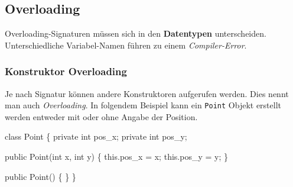 \documentclass[
  9pt,
  a4paperpaper,
  DIV=11]{scrartcl}
\newenvironment{Shaded}{}{}
\newcommand{\DataTypeTok}[1]{\textcolor[rgb]{0.84,0.23,0.29}{#1}}
\newcommand{\FunctionTok}[1]{\textcolor[rgb]{0.44,0.26,0.76}{#1}}
\newcommand{\KeywordTok}[1]{\textcolor[rgb]{0.84,0.23,0.29}{#1}}
\newcommand{\NormalTok}[1]{\textcolor[rgb]{0.14,0.16,0.18}{#1}}
\newcommand{\OperatorTok}[1]{\textcolor[rgb]{0.14,0.16,0.18}{#1}}
\numberwithin{equation}{section}
\begin{document}
\begin{multicols}{2}
\hypertarget{overloading}{%
\subsection{Overloading}\label{overloading}}

\begin{tcolorbox}[enhanced jigsaw, arc=.35mm, toprule=.15mm, leftrule=.75mm, toptitle=1mm, colbacktitle=quarto-callout-important-color!10!white, title=\textcolor{quarto-callout-important-color}{\faExclamation}\hspace{0.5em}{Wichtig}, opacityback=0, titlerule=0mm, coltitle=black, opacitybacktitle=0.6, bottomtitle=1mm, colback=white, colframe=quarto-callout-important-color-frame, left=2mm, breakable, bottomrule=.15mm, rightrule=.15mm]

Overloading-Signaturen müssen sich in den \textbf{Datentypen}
unterscheiden. Unterschiedliche Variabel-Namen führen zu einem
\emph{Compiler-Error}.

\end{tcolorbox}

\hypertarget{konstruktor-overloading}{%
\subsubsection{Konstruktor Overloading}\label{konstruktor-overloading}}

Je nach Signatur können andere Konstruktoren aufgerufen werden. Dies
nennt man auch \emph{Overloading}. In folgendem Beispiel kann ein
\texttt{Point} Objekt erstellt werden entweder mit oder ohne Angabe der
Position.

\begin{Shaded}
\begin{Highlighting}[]
\KeywordTok{class}\NormalTok{ Point }\OperatorTok{\{}
  \KeywordTok{private} \DataTypeTok{int}\NormalTok{ pos\_x}\OperatorTok{;}
  \KeywordTok{private} \DataTypeTok{int}\NormalTok{ pos\_y}\OperatorTok{;}

  \KeywordTok{public} \FunctionTok{Point}\OperatorTok{(}\DataTypeTok{int}\NormalTok{ x}\OperatorTok{,} \DataTypeTok{int}\NormalTok{ y}\OperatorTok{)} \OperatorTok{\{}
    \KeywordTok{this}\OperatorTok{.}\FunctionTok{pos\_x} \OperatorTok{=}\NormalTok{ x}\OperatorTok{;}
    \KeywordTok{this}\OperatorTok{.}\FunctionTok{pos\_y} \OperatorTok{=}\NormalTok{ y}\OperatorTok{;}
  \OperatorTok{\}}

  \KeywordTok{public} \FunctionTok{Point}\OperatorTok{()} \OperatorTok{\{} \OperatorTok{\}}
\OperatorTok{\}}
\end{Highlighting}
\end{Shaded}


\end{multicols}
\end{document}
